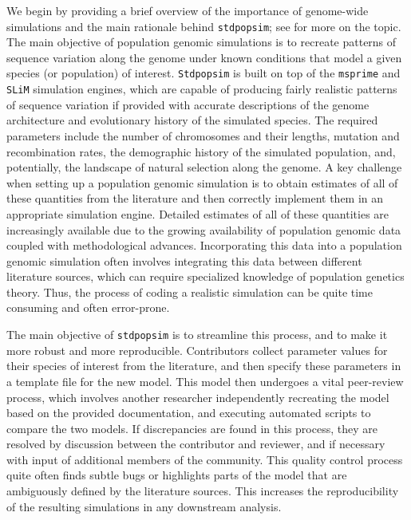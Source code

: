 \documentclass[hidelinks]{article}
\newcommand{\Stdpopsim}{\texttt{Stdpopsim}\xspace}
\newcommand{\stdpopsim}{\texttt{stdpopsim}\xspace}
\begin{document}
We begin by providing a brief overview of the importance of genome-wide simulations and the main rationale behind \stdpopsim;
see \citet{Adrion2020} for more on the topic.
The main objective of population genomic simulations is to recreate 
patterns of sequence variation along the genome under known conditions
that model a given species (or population) of interest.
\Stdpopsim is built on top of the
\texttt{msprime} \citep{Kelleher2016,Nelson2020,Baumdicker2022}
and \texttt{SLiM} \citep{Haller2019} simulation engines,
which are capable of producing fairly realistic patterns of sequence variation
if provided with accurate descriptions of the genome architecture
and evolutionary history of the simulated species.
The required parameters include the number of chromosomes and their lengths,
mutation and recombination rates, the demographic history of the simulated population,
and, potentially, the landscape of natural selection along the genome.
A key challenge when setting up a population genomic simulation is to
obtain estimates of all of these quantities from the literature
and then correctly implement them in an appropriate simulation engine.
Detailed estimates of all of these quantities are increasingly available
due to the growing availability of population genomic data
coupled with methodological advances. Incorporating this data
into a population genomic simulation often involves 
integrating this data between different literature sources, which can
require specialized knowledge of population genetics theory.
Thus, the process of coding a realistic simulation can be quite time consuming and often error-prone.

The main objective of \stdpopsim is to streamline this process,
and to make it more robust and more reproducible.
Contributors collect parameter values for their species of interest from the literature,
and then specify these parameters in a template file for the new model.
This model then undergoes a vital peer-review process,
which involves another researcher independently recreating the model based on the provided documentation,
and executing automated scripts to compare the two models.
If discrepancies are found in this process, they are resolved by discussion between the contributor and reviewer,
and if necessary with input of additional members of the community.
This quality control process quite often finds subtle bugs \citep[e.g., as in][]{Ragsdale2020}
or highlights parts of the model that are ambiguously defined by the literature sources.
This increases the reproducibility of the resulting simulations in any downstream analysis.
\end{document}
